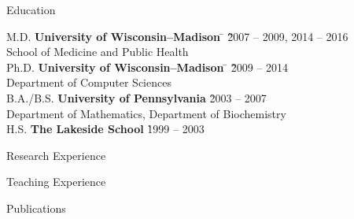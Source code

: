\documentclass{resume2} %
\begin{document}

\begin{rSection}{Education}

\begin{tabbing}
M.D.  \hspace*{2.32 em}\= \textbf{University of Wisconsin--Madison} \hspace*{5em} \= \hspace*{5em} \= \` 2007 -- 2009, 2014 -- 2016\\
\> School of Medicine and Public Health \\
Ph.D. \hspace*{2 em}\= \textbf{University of Wisconsin--Madison} \hspace*{5em} \= \hspace*{10em} \= \` 2009 -- 2014\\
\> Department of Computer Sciences \\
%
B.A./B.S. \hspace*{2 em}\> \textbf{University of Pennsylvania} \> \> \` 2003 -- 2007 \\
\> Department of Mathematics, Department of Biochemistry \\
%
H.S.\hspace*{2 em}\> \textbf{The Lakeside School} \> \> \` 1999 -- 2003 \\
\end{tabbing}
\end{rSection}

\begin{rSection}{Research Experience}

\end{rSection}

\begin{rSection}{Teaching Experience}

\end{rSection}

\begin{rSection}{Publications}

\end{rSection}
\end{document}
